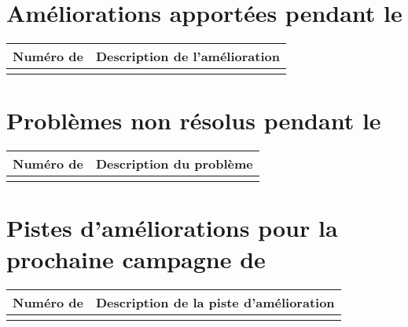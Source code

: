 \section*{Améliorations apportées pendant le \PICCourt}

\begin{table}[H]
\centering
	\begin{tabularx}{16.8cm}{|p{4cm}|X|}
	\hline
	\rowcolor{gray!40} Numéro de \FTCourt & Description de l'amélioration \\
	\hline
	 & \\
	 \hline
	\end{tabularx}
\end{table}

\section*{Problèmes non résolus pendant le \PICCourt}

\begin{table}[H]
\centering
	\begin{tabularx}{16.8cm}{|p{4cm}|X|}
	\hline
	\rowcolor{gray!40} Numéro de \FTCourt & Description du problème \\
	\hline
	 & \\
	 \hline
	\end{tabularx}
\end{table}

\section*{Pistes d'améliorations pour la prochaine campagne de \PICCourt}

\begin{table}[H]
\centering
	\begin{tabularx}{16.8cm}{|p{4cm}|X|}
	\hline
	\rowcolor{gray!40} Numéro de \FTCourt & Description de la piste d'amélioration \\
	\hline
	 & \\
	 \hline
	\end{tabularx}
\end{table}